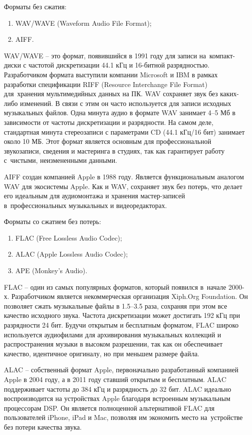 \documentclass{ou}
\begin{document}
Форматы без сжатия:
\begin{enumerate}[leftmargin=0em, itemindent=3.75em, nosep, label=\arabic*)]
\item WAV/WAVE (Waveform Audio File Format);
\item AIFF.
\end{enumerate}

WAV/WAVE -- это формат, появившийся в 1991 году для записи на~компакт-диски с частотой дискретизации 44.1 кГц и 16-битной разрядностью. Разработчиком формата выступили компании Microsoft и IBM в рамках разработки спецификации RIFF (Resource Interchange File Format) для~хранения мультимедийных данных на ПК. WAV сохраняет звук без каких-либо изменений. В связи с этим он часто используется для записи исходных музыкальных файлов. Одна минута аудио в формате WAV занимает 4–5 Мб в зависимости от частоты дискретизации и разрядности. На самом деле, стандартная минута стереозаписи с параметрами CD (44.1 кГц/16 бит) занимает около 10 МБ. Этот формат является основным для профессиональной звукозаписи, сведения и мастеринга в студиях, так как гарантирует работу с~чистыми, неизмененными данными.

AIFF создан компанией Apple в 1988 году. Является функциональным аналогом WAV для экосистемы Apple. Как и WAV, сохраняет звук без потерь, что делает его идеальным для аудиомонтажа и хранения мастер-записей в~профессиональных музыкальных и видеоредакторах.

Форматы со сжатием без потерь:
\begin{enumerate}[leftmargin=0em, itemindent=3.75em, nosep, label=\arabic*)]
\item FLAC (Free Lossless Audio Codec);
\item ALAC (Apple Lossless Audio Codec);
\item APE (Monkey's Audio).
\end{enumerate}

FLAC -- один из самых популярных форматов, который появился в~начале 2000-х. Разработчиком является некоммерческая организация Xiph.Org Foundation. Он позволяет сжать музыкальные файлы в 1.5–3.5 раза, сохраняя при этом все качество исходного звука. Частота дискретизации может достигать 192 кГц при разрядности 24 бит. Будучи открытым и бесплатным форматом, FLAC широко используется аудиофилами для архивирования музыкальных коллекций и распространения музыки в высоком разрешении, так как он обеспечивает качество, идентичное оригиналу, но при меньшем размере файла.

ALAC -- собственный формат Apple, первоначально разработанный компанией Apple в 2004 году, а в 2011 году ставший открытым и бесплатным. ALAC поддерживает частоты до 384 кГц и разрядность до 32 бит. ALAC идеально воспроизводится на устройствах Apple благодаря встроенным музыкальным процессорам DSP. Он является полноценной альтернативой FLAC для пользователей iPhone, iPad и Mac, позволяя им экономить место на~устройстве без потери качества звука.
\end{document}
